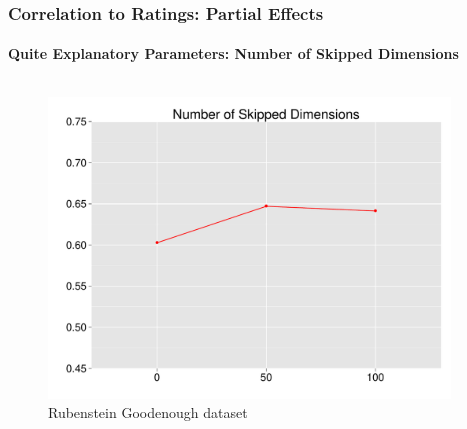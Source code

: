 \documentclass[t]{beamer} %
\begin{document}
\begin{frame}
  \frametitle{Correlation to Ratings: Partial Effects}
  \framesubtitle{Quite Explanatory Parameters: Number of Skipped Dimensions}

  \vspace{-18pt}

  \begin{columns}
    
    \begin{column}{0.5\textwidth}
      \begin{figure} 
        \hspace*{-18pt} 
        \includegraphics[scale=0.30]{img/lapesa_rg_main_dimskip}
        \vspace{-10pt}
        \caption{Rubenstein Goodenough dataset}
      \end{figure}
    \end{column}

    \begin{column}{0.5\textwidth}
      \centering
      

\end{column}
\end{columns}
\end{frame}
\end{document}
